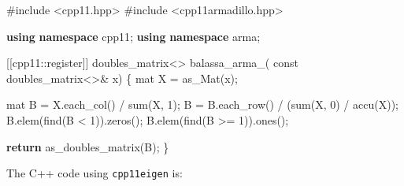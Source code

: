 \documentclass[12pt]{article}
\newenvironment{Shaded}{\begin{snugshade}}{\end{snugshade}}
\newcommand{\AttributeTok}[1]{\textcolor[rgb]{0.40,0.45,0.13}{#1}}
\newcommand{\ControlFlowTok}[1]{\textcolor[rgb]{0.00,0.23,0.31}{\textbf{#1}}}
\newcommand{\DecValTok}[1]{\textcolor[rgb]{0.68,0.00,0.00}{#1}}
\newcommand{\ImportTok}[1]{\textcolor[rgb]{0.00,0.46,0.62}{#1}}
\newcommand{\KeywordTok}[1]{\textcolor[rgb]{0.00,0.23,0.31}{\textbf{#1}}}
\newcommand{\NormalTok}[1]{\textcolor[rgb]{0.00,0.23,0.31}{#1}}
\newcommand{\OperatorTok}[1]{\textcolor[rgb]{0.37,0.37,0.37}{#1}}
\newcommand{\PreprocessorTok}[1]{\textcolor[rgb]{0.68,0.00,0.00}{#1}}
\newcommand{\VariableTok}[1]{\textcolor[rgb]{0.07,0.07,0.07}{#1}}
\begin{document}
\begin{Shaded}
\begin{Highlighting}[]
\PreprocessorTok{\#include }\ImportTok{\textless{}cpp11.hpp\textgreater{}}
\PreprocessorTok{\#include }\ImportTok{\textless{}cpp11armadillo.hpp\textgreater{}}

\KeywordTok{using} \KeywordTok{namespace}\NormalTok{ cpp11}\OperatorTok{;}
\KeywordTok{using} \KeywordTok{namespace}\NormalTok{ arma}\OperatorTok{;}

\OperatorTok{[[}\AttributeTok{cpp11}\OperatorTok{::}\AttributeTok{register}\OperatorTok{]]}\NormalTok{ doubles\_matrix}\OperatorTok{\textless{}\textgreater{}} \VariableTok{balassa\_arma\_}\OperatorTok{(}
  \AttributeTok{const}\NormalTok{ doubles\_matrix}\OperatorTok{\textless{}\textgreater{}\&}\NormalTok{ x}\OperatorTok{)} \OperatorTok{\{}
\NormalTok{  mat X }\OperatorTok{=}\NormalTok{ as\_Mat}\OperatorTok{(}\NormalTok{x}\OperatorTok{);}

\NormalTok{  mat B }\OperatorTok{=}\NormalTok{ X}\OperatorTok{.}\NormalTok{each\_col}\OperatorTok{()} \OperatorTok{/}\NormalTok{ sum}\OperatorTok{(}\NormalTok{X}\OperatorTok{,} \DecValTok{1}\OperatorTok{);}
\NormalTok{  B }\OperatorTok{=}\NormalTok{ B}\OperatorTok{.}\NormalTok{each\_row}\OperatorTok{()} \OperatorTok{/} \OperatorTok{(}\NormalTok{sum}\OperatorTok{(}\NormalTok{X}\OperatorTok{,} \DecValTok{0}\OperatorTok{)} \OperatorTok{/}\NormalTok{ accu}\OperatorTok{(}\NormalTok{X}\OperatorTok{));}
\NormalTok{  B}\OperatorTok{.}\NormalTok{elem}\OperatorTok{(}\NormalTok{find}\OperatorTok{(}\NormalTok{B }\OperatorTok{\textless{}} \DecValTok{1}\OperatorTok{)).}\NormalTok{zeros}\OperatorTok{();}
\NormalTok{  B}\OperatorTok{.}\NormalTok{elem}\OperatorTok{(}\NormalTok{find}\OperatorTok{(}\NormalTok{B }\OperatorTok{\textgreater{}=} \DecValTok{1}\OperatorTok{)).}\NormalTok{ones}\OperatorTok{();}

  \ControlFlowTok{return}\NormalTok{ as\_doubles\_matrix}\OperatorTok{(}\NormalTok{B}\OperatorTok{);}
\OperatorTok{\}}
\end{Highlighting}
\end{Shaded}

The C++ code using \texttt{cpp11eigen} is:
\end{document}

